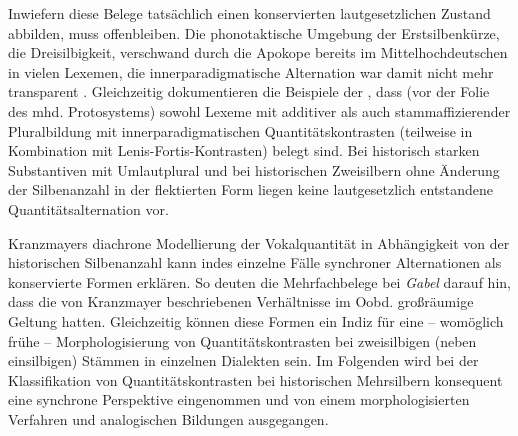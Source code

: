 Inwiefern diese Belege tatsächlich einen konservierten lautgesetzlichen Zustand abbilden, muss offenbleiben. Die phonotaktische Umgebung der Erstsilbenkürze, die Dreisilbigkeit, verschwand durch die Apokope bereits im Mittelhochdeutschen in vielen Lexemen, die innerparadigmatische Alternation war damit nicht mehr transparent \citep[83]{Kranzmayer1935}. Gleichzeitig dokumentieren die Beispiele der , dass (vor der Folie des mhd. Protosystems) sowohl Lexeme mit additiver als auch stammaffizierender Pluralbildung mit innerparadigmatischen Quantitätskontrasten (teilweise in Kombination mit Lenis-Fortis-Kontrasten) belegt sind. Bei historisch starken Substantiven mit Umlautplural und bei historischen Zweisilbern ohne Änderung der Silbenanzahl in der flektierten Form liegen keine lautgesetzlich entstandene Quantitätsalternation vor.

Kranzmayers diachrone Modellierung der Vokalquantität in Abhängigkeit von der historischen Silbenanzahl kann indes einzelne Fälle synchroner Alternationen als konservierte Formen erklären. So deuten die Mehrfachbelege bei \textit{Gabel} darauf hin, dass die von Kranzmayer beschriebenen Verhältnisse im Oobd. großräumige Geltung hatten. Gleichzeitig können diese Formen ein Indiz für eine -- womöglich frühe -- Morphologisierung von Quantitätskontrasten bei zweisilbigen (neben einsilbigen) Stämmen in einzelnen Dialekten sein. Im Folgenden wird bei der Klassifikation von Quantitätskontrasten bei historischen Mehrsilbern konsequent eine synchrone Perspektive eingenommen und von einem morphologisierten Verfahren und analogischen Bildungen ausgegangen.


